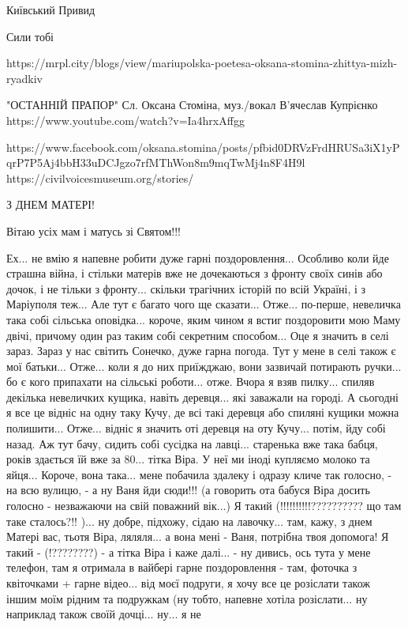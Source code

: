 Київський Привид

Сили тобі

https://mrpl.city/blogs/view/mariupolska-poetesa-oksana-stomina-zhittya-mizh-ryadkiv

"ОСТАННІЙ ПРАПОР" Сл. Оксана Стоміна, муз./вокал В'ячеслав Купрієнко
https://www.youtube.com/watch?v=Ia4hrxAffgg

https://www.facebook.com/oksana.stomina/posts/pfbid0DRVzFrdHRUSa3iX1yPqrP7P5Aj4bbH33uDCJgzo7rfMThWon8m9mqTwMj4n8F4H9l
https://civilvoicesmuseum.org/stories/%

З ДНЕМ МАТЕРІ!

Вітаю усіх мам і матусь зі Святом!!!

Ех... не вмію я напевне робити дуже гарні поздоровлення... Особливо коли йде
страшна війна, і стільки матерів вже не дочекаються з фронту своїх синів або
дочок, і не тільки з фронту... скільки трагічних історій по всій Україні, і з
Маріуполя теж...  Але тут є багато чого ще сказати...  Отже... по-перше,
невеличка така собі сільська оповідка...  короче, яким чином я встиг
поздоровити мою Маму двічі, причому один раз таким собі секретним способом...
Оце я значить в селі зараз. Зараз у нас світить Сонечко, дуже гарна погода. Тут
у мене в селі також є мої батьки...  Отже... коли я до них приїжджаю, вони
зазвичай потирають ручки... бо є кого припахати на сільські роботи... отже.
Вчора я взяв пилку...  спиляв декілька невеличких кущика, навіть деревця... які
заважали на городі. А сьогодні я все це відніс на одну таку Кучу, де всі такі
деревця або спиляні кущики можна полишити...  Отже... відніс я значить оті
деревця на оту Кучу...  потім, йду собі назад. Аж тут бачу, сидить собі сусідка
на лавці... старенька вже така бабця, років здається їй вже за 80... тітка
Віра. У неї ми іноді купляємо молоко та яйця... Короче, вона така... мене
побачила здалеку і одразу кличе так голосно, - на всю вулицю, - а ну Ваня йди
сюди!!! (а говорить ота бабуся Віра досить голосно - незважаючи на свій
поважний вік...) Я такий (!!!!!!!!!!?????????? що там таке сталось?!! )...  ну
добре, підхожу, сідаю на лавочку... там, кажу, з днем Матері вас, тьотя Віра,
ляляля... а вона мені - Ваня, потрібна твоя допомога! Я такий - (!????????) - а
тітка Віра і каже далі... - ну дивись, ось тута у мене телефон, там я отримала
в вайбері гарне поздоровлення - там, фоточка з квіточками + гарне відео... від
моєї подруги, я хочу все це розіслати також іншим моїм рідним та подружкам (ну
тобто, напевне хотіла розіслати... ну наприклад також своїй дочці... ну... я не
